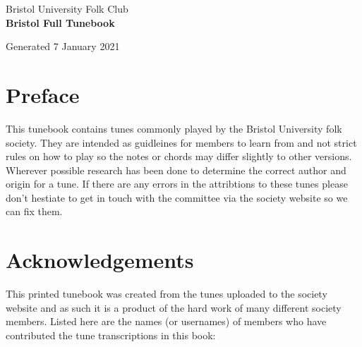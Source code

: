 \documentclass[12pt,a4paper,twoside]{article}
\makeatletter
\newcommand{\thetitle}{Bristol Full Tunebook}
\newcommand{\thedate}{7 January 2021}
\renewcommand\tableofcontents{%
    \begin{multicols}{2}[
      \centering
      \section*{\large\contentsname
        \@mkboth{%
           \MakeUppercase\contentsname}{\MakeUppercase\contentsname}}]
    \@starttoc{toc}%
    \end{multicols}
}
\makeatother
\begin{document}
\begin{titlepage}
   \begin{center}
       \large Bristol University Folk Club \\

       \vspace{4cm}
       \textbf{\Huge \thetitle}

       \vspace{0.5cm}
       Generated \thedate

       \vspace{1.5cm}

       \vfill

   \end{center}
\end{titlepage}

\tableofcontents

\section{Preface}

This tunebook contains tunes commonly played by the Bristol University folk society. They are intended as guidleines for members to learn from and not strict rules on how to play so the notes or chords may differ slightly to other versions.
Wherever possible research has been done to determine the correct author and origin for a tune. If there are any errors in the attribtions to these tunes please don't hestiate to get in touch with the committee via the society website so we can fix them.

\section{Acknowledgements}

This printed tunebook was created from the tunes uploaded to the society website and as such it is a product of the hard work of many different society members. Listed here are the names (or usernames) of members who have contributed the tune transcriptions in this book:
\end{document}
